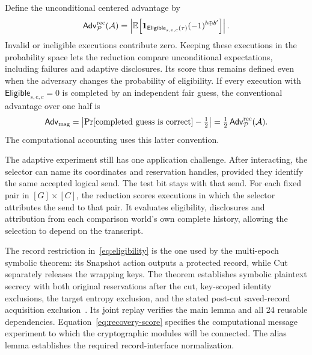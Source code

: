 \documentclass[pdflatex]{sn-jnl}
\theoremstyle{thmstyleone}
\theoremstyle{thmstylethree}
\theoremstyle{thmstyletwo}
\begin{document}
Define the unconditional centered advantage by
\begin{equation}
 \mathsf{Adv}^{\rm rec}_{\mathcal P}(\mathcal A)
   =
 \left|
   \mathbb E\!\left[
    \mathbf 1_{\mathsf{Eligible}_{s,e,c}(\tau)}
                       (-1)^{b\oplus b'}\right]
 \right|.
 \label{eq:recovery-score}
\end{equation}
Invalid or ineligible executions contribute zero. Keeping these executions
in the probability space lets the reduction compare unconditional
expectations, including failures and adaptive disclosures. Its score thus
remains defined even when the adversary changes the probability of eligibility.
If every execution with $\mathsf{Eligible}_{s,e,c}=0$ is completed by an
independent fair guess, the conventional advantage over one half is
\[
 \mathsf{Adv}_{\rm msg}
   =\left|\Pr[\text{completed guess is correct}]-\tfrac12\right|
   =\tfrac12\,\mathsf{Adv}^{\rm rec}_{\mathcal P}(\mathcal A).
\]
The computational accounting uses this latter convention.

The adaptive experiment still has one application challenge. After
interacting, the selector can name its coordinates and reservation
handles, provided they identify the same accepted logical send. The
test bit stays with that send. For each fixed pair in $[G]\times[C]$,
the reduction scores executions in which the selector attributes the
send to that pair. It evaluates eligibility, disclosures and attribution
from each comparison world's own complete history, allowing the
selection to depend on the transcript.

The record restriction in~\eqref{eq:eligibility} is the one used by the
multi-epoch symbolic theorem: its \textsf{Snapshot} action outputs
a protected record, while \textsf{Cut} separately releases the wrapping keys.
The theorem establishes symbolic plaintext secrecy with both original
reservations after the cut, key-scoped identity exclusions, the target
entropy exclusion, and the stated post-cut saved-record acquisition
exclusion~\cite{qperiaptSymbolic2026}.  Its joint replay verifies the main
lemma and all 24 reusable dependencies.  Equation~\eqref{eq:recovery-score}
specifies the computational message experiment to which the cryptographic
modules will be connected. The alias lemma establishes the required
record-interface normalization.
\end{document}

